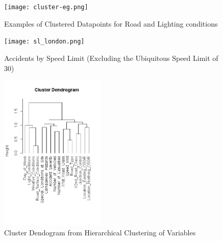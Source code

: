 \documentclass{neu_handout}
\begin{document}
\begin{figure}[!htb]
    \begin{center}
      \texttt{[image: cluster-eg.png]}
      \caption{Examples of Clustered Datapoints for Road and Lighting conditions}
    \end{center}
\end{figure}


\begin{figure}[!htb]
    \begin{center}
      \texttt{[image: sl\_london.png]}
      \caption{Accidents by Speed Limit (Excluding the Ubiquitous Speed Limit of 30)}
    \end{center}
\end{figure}

\begin{figure}[!htb]
    \begin{center}
      \includegraphics[height=7.5cm,keepaspectratio]{Dendrogram-of-variable-cluster.png}
      \caption{Cluster Dendogram from Hierarchical Clustering of Variables}
    \end{center}
\end{figure}
\end{document}
